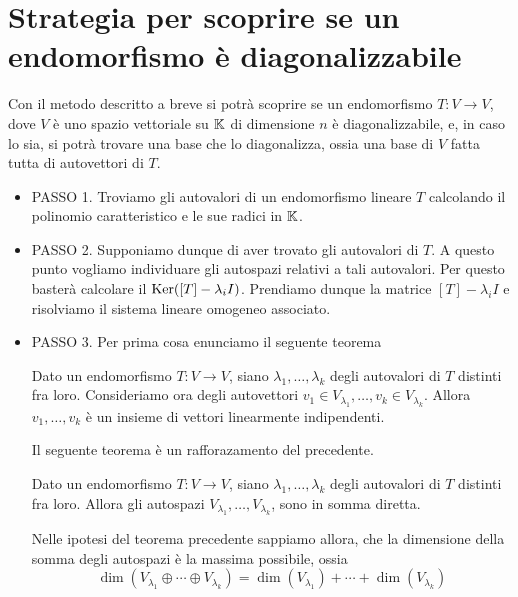 \section{Strategia per scoprire se un endomorfismo è diagonalizzabile}
Con il metodo descritto a breve si potrà scoprire se un endomorfismo
$T : V \to V$, dove $V$ è uno spazio vettoriale su $\mathbb{K}$ di dimensione $n$
è diagonalizzabile, e, in caso lo sia, si potrà trovare una base che lo diagonalizza,
ossia una base di $V$ fatta tutta di autovettori di $T$.

\begin{itemize}
	\item PASSO 1. Troviamo gli autovalori di un endomorfismo lineare $T$ calcolando il polinomio
	      caratteristico e le sue radici in $\mathbb{K}$.
	\item PASSO 2. Supponiamo dunque di aver trovato gli autovalori di $T$. A questo punto
	      vogliamo individuare gli autospazi relativi a tali autovalori.
	      Per questo basterà calcolare il $\operatorname{Ker}([T] - \lambda_i I)$. Prendiamo dunque la
	      matrice $[T] - \lambda_i I$ e risolviamo il sistema lineare omogeneo associato.
	\item PASSO 3. Per prima cosa enunciamo il seguente teorema
	      \begin{theorem}
		      Dato un endomorfismo $T : V \to V$, siano $\lambda_1, \dots, \lambda_k$
		      degli autovalori di $T$ distinti fra loro. Consideriamo ora degli autovettori
		      $v_1 \in V_{\lambda_1}, \dots, v_k \in V_{\lambda_k}$. Allora
		      $v_1, \dots, v_k$ è un insieme di vettori linearmente indipendenti.
	      \end{theorem}

	      Il seguente teorema è un rafforazamento del precedente.
	      \begin{theorem}
		      Dato un endomorfismo $T : V \to V$, siano $\lambda_1, \dots, \lambda_k$ degli
		      autovalori di $T$ distinti fra loro. Allora gli autospazi
		      $V_{\lambda_1}, \dots, V_{\lambda_k}$, sono in somma diretta.
	      \end{theorem}

	      Nelle ipotesi del teorema precedente sappiamo allora, che la dimensione della somma
	      degli autospazi è la massima possibile, ossia
	      \[
		      \dim(V_{\lambda_1} \oplus \cdots \oplus V_{\lambda_k}) = \dim(V_{\lambda_1}) +
		      \cdots + \dim(V_{\lambda_k})
	      \]


\end{itemize}
